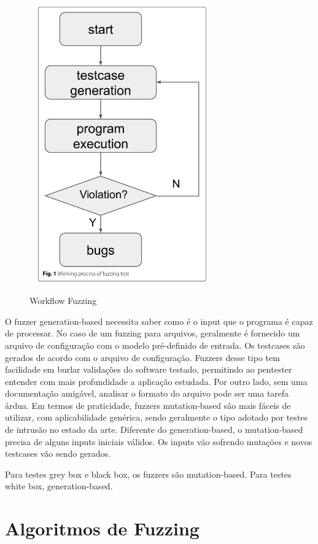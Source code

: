 \begin{figure}[ht]
    \centering
    \caption{Workflow Fuzzing}
    \includegraphics[width=8cm,height=12cm,keepaspectratio]{figuras/fuzzing imagem.png} 
    \label{fig:internet} 
\end{figure}

O fuzzer generation-based necessita saber como é o input que o programa é capaz de processar. No caso de um fuzzing para arquivos, geralmente é fornecido um arquivo de configuração com o modelo pré-definido de entrada. Os testcases são gerados de acordo com o arquivo de configuração. Fuzzers desse tipo tem facilidade em burlar validações do software testado, permitindo ao pentester entender com mais profundidade a aplicação estudada. Por outro lado, sem uma documentação amigável, analisar o formato do arquivo pode ser uma tarefa árdua.
Em termos de praticidade, fuzzers mutation-based são mais fáceis de utilizar, com aplicabilidade genérica, sendo geralmente o tipo adotado por testes de intrusão no estado da arte. Diferente do generation-based, o mutation-based precisa de alguns inputs iniciais válidos. Os inputs vão sofrendo mutações e novos testcases vão sendo gerados. 

Para testes grey box e black box, os fuzzers são mutation-based. Para testes white box, generation-based.

\section{Algoritmos de Fuzzing}

